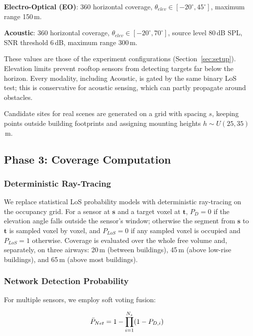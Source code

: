 \textbf{Electro-Optical (EO)}: 360\textdegree{} horizontal coverage, $\theta_{elev} \in [-20^{\circ}, 45^{\circ}]$, maximum range 150\,m.

\textbf{Acoustic}: 360\textdegree{} horizontal coverage, $\theta_{elev} \in [-20^{\circ}, 70^{\circ}]$, source level 80\,dB SPL, SNR threshold 6\,dB, maximum range 300\,m.

These values are those of the experiment configurations (Section~\ref{sec:setup}). Elevation limits prevent rooftop sensors from detecting targets far below the horizon. Every modality, including Acoustic, is gated by the same binary LoS test; this is conservative for acoustic sensing, which can partly propagate around obstacles.

Candidate sites for real scenes are generated on a grid with spacing \(s\), keeping points outside building footprints and assigning mounting heights \(h\sim U(25,35)\)\,m.

\subsection{Phase 3: Coverage Computation}

\subsubsection{Deterministic Ray-Tracing}

We replace statistical LoS probability models \cite{3gpp38901,itur_p1411} with deterministic ray-tracing on the occupancy grid. For a sensor at \(\mathbf{s}\) and a target voxel at \(\mathbf{t}\), \(P_D=0\) if the elevation angle falls outside the sensor's window; otherwise the segment from \(\mathbf{s}\) to \(\mathbf{t}\) is sampled voxel by voxel, and \(P_{LoS}=0\) if any sampled voxel is occupied and \(P_{LoS}=1\) otherwise. Coverage is evaluated over the whole free volume and, separately, on three airways: 20\,m (between buildings), 45\,m (above low-rise buildings), and 65\,m (above most buildings).

\subsubsection{Network Detection Probability}

For multiple sensors, we employ soft voting fusion:

\begin{equation}
\bar{P}_{Net} = 1 - \prod_{i=1}^{N_s} (1 - P_{D,i})
\label{eq:pnet}
\end{equation}

